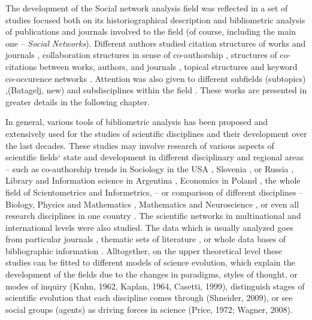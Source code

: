 \documentclass[11pt]{article} %
\newcommand{\Remark}[1]{\ifodd\value{page} \normalmarginpar
 \else \reversemarginpar \fi \marginpar{{\footnotesize #1}} }
\begin{document}
The development of the Social network analysis field was reflected in a set of studies focused both on its historiographical description \citep{SNAdev} and bibliometric analysis of publications and journals involved to the field (of course, including the main one -- \textit {Social Networks}). Different authors studied citation structures of works and journals \citep{normSci,leydes,Understand}, collaboration structures in sense of co-authorship \citep{SNAinf, leydes,Understand}, structures of co-citations between works, authors, and journals \citep{brandes}, topical structures and keyword co-occurence networks \citep{leydes,lookingglass}. Attention was also given to different subfields (subtopics)  \citep{central,kejzar, Understand},(Batagelj, new) and subdisciplines within the field \citep{SNAinf,borgatti,lazer,varga}. These works are presented in greater details in the following chapter. \medskip 

In general, various tools of bibliometric analysis has been proposed and extensively used for the studies of scientific disciplines and their development over the last decades. These studies may involve research of various aspects of scientific fields` state and development in different disciplinary and regional areas -- such as co-authorship trends in Sociology in the USA \citep{moody, sociol}, Slovenia \citep{mali}, or Russia \citep{sokolov},  Library and Information science in Argentina \citep{rodriguez}, Economics in Poland \citep{polish}, the whole field of  Scientometrics and Informetrics\citep{hou}, -- or comparison of different disciplines -- Biology, Physics and Mathematics \citep{newman1, newman4}, Mathematics and Neuroscience \citep{Evol}, or even all research disciplines in one country \citep{kroneg,ferligoj,cugmas}. The scientific networks in multinational \citep{glaenzel} and international \citep{wagner} levels were also studied. The data which is usually analyzed goes from particular journals \citep{conflict}, thematic sets of literature \citep{dna,PeerRew}, or whole data bases of bibliographic information \citep{kroneg}. \Remark{Should we include the following?}Alltogether, on the upper theoretical level these studies can be fitted to different models of science evolution, which explain the development of the fields due to the changes in paradigms, styles of thought, or modes of inquiry (Kuhn, 1962, Kaplan, 1964, Casetti, 1999), distinguish stages of scientific evolution that each discipline comes through (Shneider, 2009), or see social groups (agents) as driving forces in science (Price, 1972; Wagner, 2008). \medskip 
\end{document}
